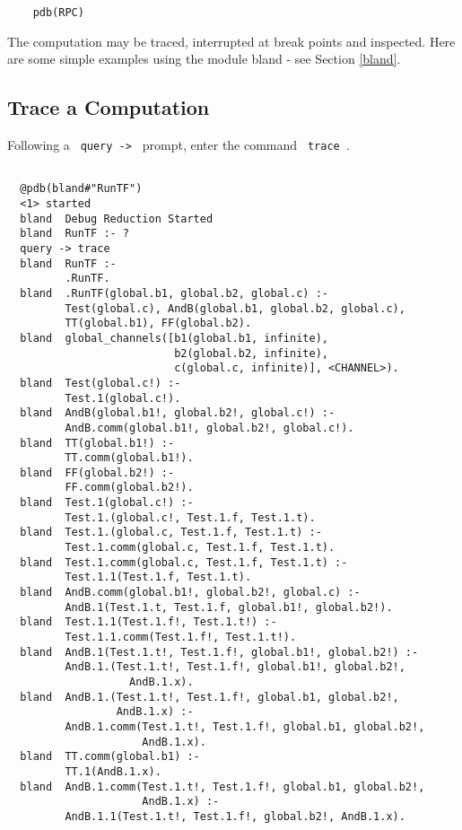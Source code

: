 \begin{verbatim}
    pdb(RPC)
\end{verbatim}

\noindent
The computation may be traced, interrupted at break points and
inspected.  Here are some simple examples using the module bland -
see Section \ref{bland}.

\subsection{Trace a Computation}

Following a \verb+ query -> + prompt, enter the command \verb+ trace +.

\begin{verbatim}

  @pdb(bland#"RunTF")
  <1> started
  bland  Debug Reduction Started
  bland  RunTF :- ?
  query -> trace
  bland  RunTF :- 
         .RunTF.
  bland  .RunTF(global.b1, global.b2, global.c) :- 
         Test(global.c), AndB(global.b1, global.b2, global.c),
         TT(global.b1), FF(global.b2).
  bland  global_channels([b1(global.b1, infinite),
                          b2(global.b2, infinite),
                          c(global.c, infinite)], <CHANNEL>).
  bland  Test(global.c!) :- 
         Test.1(global.c!).
  bland  AndB(global.b1!, global.b2!, global.c!) :- 
         AndB.comm(global.b1!, global.b2!, global.c!).
  bland  TT(global.b1!) :- 
         TT.comm(global.b1!).
  bland  FF(global.b2!) :- 
         FF.comm(global.b2!).
  bland  Test.1(global.c!) :- 
         Test.1.(global.c!, Test.1.f, Test.1.t).
  bland  Test.1.(global.c, Test.1.f, Test.1.t) :- 
         Test.1.comm(global.c, Test.1.f, Test.1.t).
  bland  Test.1.comm(global.c, Test.1.f, Test.1.t) :- 
         Test.1.1(Test.1.f, Test.1.t).
  bland  AndB.comm(global.b1!, global.b2!, global.c) :- 
         AndB.1(Test.1.t, Test.1.f, global.b1!, global.b2!).
  bland  Test.1.1(Test.1.f!, Test.1.t!) :- 
         Test.1.1.comm(Test.1.f!, Test.1.t!).
  bland  AndB.1(Test.1.t!, Test.1.f!, global.b1!, global.b2!) :- 
         AndB.1.(Test.1.t!, Test.1.f!, global.b1!, global.b2!,
                   AndB.1.x).
  bland  AndB.1.(Test.1.t!, Test.1.f!, global.b1, global.b2!,
                 AndB.1.x) :- 
         AndB.1.comm(Test.1.t!, Test.1.f!, global.b1, global.b2!,
                     AndB.1.x).
  bland  TT.comm(global.b1) :- 
         TT.1(AndB.1.x).
  bland  AndB.1.comm(Test.1.t!, Test.1.f!, global.b1, global.b2!,
                     AndB.1.x) :- 
         AndB.1.1(Test.1.t!, Test.1.f!, global.b2!, AndB.1.x).

\end{verbatim}
